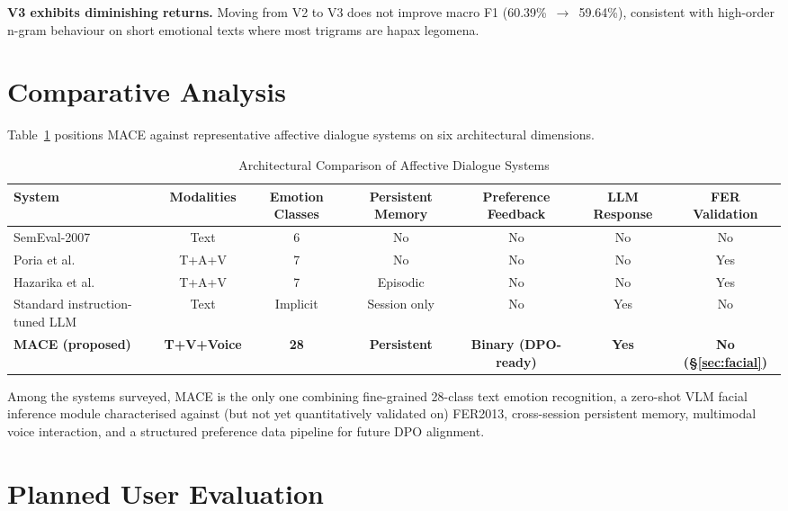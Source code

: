 \documentclass[conference]{IEEEtran}
\begin{document}
\textbf{V3 exhibits diminishing returns.}
Moving from V2 to V3 does not improve macro F1
(60.39\%~$\to$~59.64\%), consistent with high-order n-gram
behaviour on short emotional texts where most trigrams are
hapax legomena.

\section{Comparative Analysis}
\label{sec:comparison}

Table~\ref{tab:comparison} positions MACE against representative
affective dialogue systems on six architectural dimensions.

\begin{table}[htbp]
\centering
\caption{Architectural Comparison of Affective Dialogue Systems}
\label{tab:comparison}
\begin{tabular}{lcccccc}
\toprule
\textbf{System} &
\textbf{Modalities} &
\textbf{Emotion Classes} &
\textbf{Persistent Memory} &
\textbf{Preference Feedback} &
\textbf{LLM Response} &
\textbf{FER Validation} \\
\midrule
SemEval-2007~\cite{strapparava2007semeval} &
Text & 6 & No & No & No & No \\
Poria et al.~\cite{poria2016convolutional} &
T+A+V & 7 & No & No & No & Yes \\
Hazarika et al.~\cite{hazarika2018conversational} &
T+A+V & 7 & Episodic & No & No & Yes \\
Standard instruction-tuned LLM &
Text & Implicit & Session only & No & Yes & No \\
\textbf{MACE (proposed)} &
\textbf{T+V+Voice} &
\textbf{28} &
\textbf{Persistent} &
\textbf{Binary (DPO-ready)} &
\textbf{Yes} &
\textbf{No (\S\ref{sec:facial})} \\
\bottomrule
\end{tabular}
\end{table}

Among the systems surveyed, MACE is the only one combining
fine-grained 28-class text emotion recognition, a zero-shot VLM
facial inference module characterised against (but not yet
quantitatively validated on) FER2013, cross-session persistent
memory, multimodal voice interaction, and a structured preference
data pipeline for future DPO alignment.

\section{Planned User Evaluation}
\label{sec:userstudy}
\end{document}
